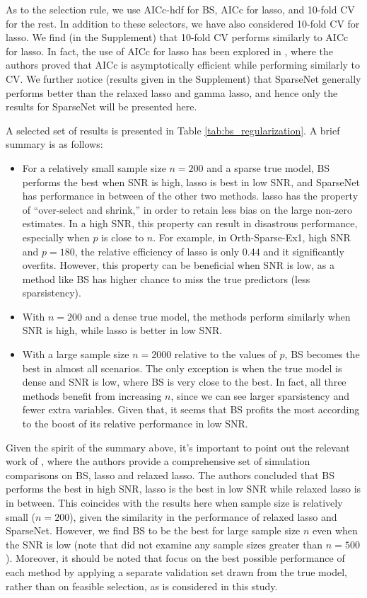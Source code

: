 As to the selection rule, we use AICc-hdf for BS, AICc for lasso, and 10-fold CV for the rest. In addition to these selectors, we have also considered 10-fold CV for lasso. We find (in the Supplement) that 10-fold CV performs similarly to AICc for lasso. In fact, the use of AICc for lasso has been explored in \citet{Flynn2013}, where the authors proved that AICc is asymptotically efficient while performing similarly to CV. We further notice (results given in the Supplement) that SparseNet generally performs better than the relaxed lasso and gamma lasso, and hence only the results for SparseNet will be presented here. 

A selected set of results is presented in Table \ref{tab:bs_regularization}. A brief summary is as follows:
\begin{itemize}
	\item For a relatively small sample size $n=200$ and a sparse true model, BS performs the best when SNR is high,  lasso is best in low SNR, and SparseNet has performance in between of the other two methods. lasso has the property of ``over-select and shrink,'' in order to retain less bias on the large non-zero estimates. In a high SNR, this property can result in disastrous performance, especially when $p$ is close to $n$. For example, in Orth-Sparse-Ex1, high SNR and $p=180$, the relative efficiency of lasso is only $0.44$ and it significantly overfits. However, this property can be beneficial when SNR is low, as a method like BS has higher chance to miss the true predictors (less sparsistency).
	
	\item With $n=200$ and a dense true model, the methods perform similarly when SNR is high, while lasso is better in low SNR.
	
	\item With a large sample size $n=2000$ relative to the values of $p$, BS becomes the best in almost all scenarios. The only exception is when the true model is dense and SNR is low, where BS is very close to the best. In fact, all three methods benefit from increasing $n$, since we can see larger sparsistency and fewer extra variables. Given that, it seems that BS profits the most according to the boost of its relative performance in low SNR. 
\end{itemize}

Given the spirit of the summary above, it's important to point out the relevant work of \citet{Hastie2017}, where the authors provide a comprehensive set of simulation comparisons on BS, lasso and relaxed lasso. The authors concluded that BS performs the best in high SNR, lasso is the best in low SNR while relaxed lasso is in between. This coincides with the results here when sample size is relatively small ($n=200$), given the similarity in the performance of relaxed lasso and SparseNet. However, we find BS to be the best for large sample size $n$ even when the SNR is low (note that \citet{Hastie2017} did not examine any sample sizes greater than $n=500$). Moreover, it should be noted that \citet{Hastie2017} focus on the best possible performance of each method by applying a separate validation set drawn from the true model, rather than on feasible selection, as is considered in this study. 

